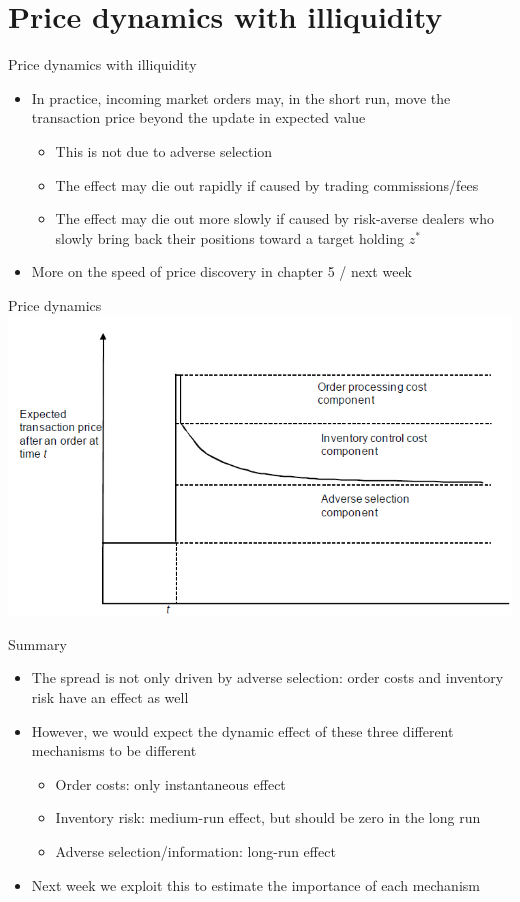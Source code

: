 \documentclass[english,10pt
,aspectratio=169
]{beamer}
\begin{document}
\section{Price dynamics with illiquidity}

\begin{frame}{Price dynamics with illiquidity}
	\begin{itemize}
		\item In practice, incoming market orders may, in the short run, move the transaction price beyond the update in expected value
		\begin{itemize}
			\item This is not due to adverse selection
			\item The effect may die out rapidly if caused by trading commissions/fees
			\item The effect may die out more slowly if caused by risk-averse dealers who slowly bring back their positions toward a target holding $z^*$
		\end{itemize}
		\item More on the speed of price discovery in chapter 5 / next week
	\end{itemize}
\end{frame}


\begin{frame}{Price dynamics}
	\includegraphics[width=0.85\linewidth]{pics/PriceDiscovery_Image}
\end{frame}


\begin{frame}{Summary}
	\begin{itemize}
		\item The spread is not only driven by adverse selection: order costs and inventory risk have an effect as well
		\item However, we would expect the dynamic effect of these three different mechanisms to be different
		\begin{itemize}
			\item Order costs: only instantaneous effect 
			\item Inventory risk: medium-run effect, but should be zero in the long run
			\item Adverse selection/information: long-run effect 
		\end{itemize}
		\item Next week we exploit this to estimate the importance of each mechanism
	\end{itemize}
\end{frame}
\end{document}
